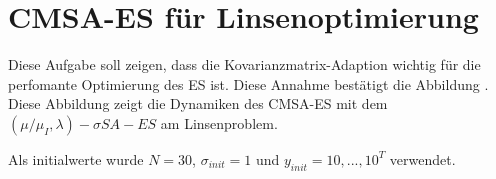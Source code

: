 \chapter{CMSA-ES für Linsenoptimierung}

Diese Aufgabe soll zeigen, dass die Kovarianzmatrix-Adaption wichtig für die perfomante Optimierung des ES ist. Diese Annahme bestätigt die Abbildung . Diese Abbildung zeigt die Dynamiken des CMSA-ES mit dem $(\mu/\mu_I,\lambda)-\sigma SA-ES$ am Linsenproblem.

Als initialwerte wurde $N=30$, $\sigma_{init}=1$ und $y_{init}={10,...,10}^T$ verwendet.






